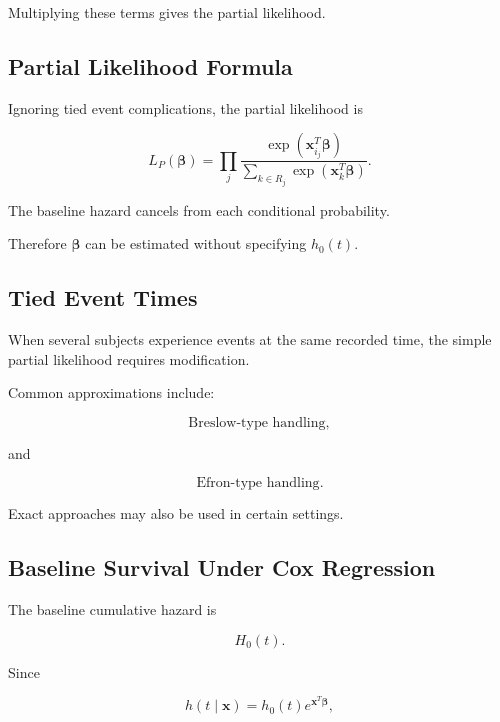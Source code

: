 Multiplying these terms gives the partial likelihood.

\subsection{Partial Likelihood Formula}
\label{subsec:cox-partial-likelihood-formula}

Ignoring tied event complications, the partial likelihood is

\[
\boxed{
L_P
(
\boldsymbol{\beta}
)
=
\prod_{j}
\frac{
\exp
(
\mathbf{x}_{i_j}^T
\boldsymbol{\beta}
)
}{
\displaystyle
\sum_{k\in R_j}
\exp
(
\mathbf{x}_k^T
\boldsymbol{\beta}
)
}.
}
\]

The baseline hazard cancels from each conditional probability.

Therefore \(\boldsymbol{\beta}\) can be estimated without specifying
\(h_0(t)\).

\subsection{Tied Event Times}
\label{subsec:cox-ties}

When several subjects experience events at the same recorded time, the
simple partial likelihood requires modification.

Common approximations include:

\[
\boxed{
\text{Breslow-type handling},
}
\]

and

\[
\boxed{
\text{Efron-type handling}.
}
\]

Exact approaches may also be used in certain settings.

\subsection{Baseline Survival Under Cox Regression}
\label{subsec:cox-baseline-survival}

The baseline cumulative hazard is

\[
\boxed{
H_0(t).
}
\]

Since

\[
h(t\mid\mathbf{x})
=
h_0(t)
e^{\mathbf{x}^T\boldsymbol{\beta}},
\]

